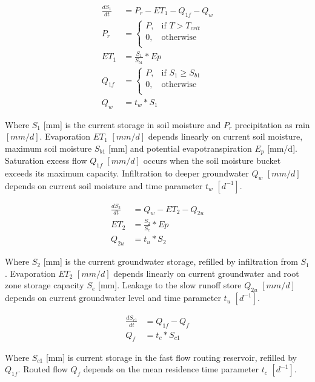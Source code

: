 {\begin{align}
	\frac{dS_1}{dt} &= P_r-ET_1-Q_{1f}-Q_w \\
	P_r &= \begin{cases}
		P, &\text{if } T > T_{crit} \\
		0, & \text{otherwise} \\
	\end{cases} \\
	ET_1 &= \frac{S_1}{S_{b1}}*Ep\\
	Q_{1f} &= \begin{cases}
		P, &\text{if } S_1 \geq S_{b1} \\
		0, & \text{otherwise} \\
	\end{cases} \\
	Q_w &= t_w*S_1
\end{align}

} %

Where $S_1$ [mm] is the current storage in soil moisture and $P_r$ precipitation as rain $[mm/d]$. Evaporation $ET_1$ $[mm/d]$ depends linearly on current soil moisture, maximum soil moisture $S_{b1}$ [mm] and potential evapotranspiration $E_p$ [mm/d]. Saturation excess flow $Q_{1f}$  $[mm/d]$ occurs when the soil moisture bucket exceeds its maximum capacity. Infiltration to deeper groundwater $Q_w$  $[mm/d]$ depends on current soil moisture and time parameter $t_w$  $[d^{-1}]$.

\begin{align}
	\frac{dS_2}{dt} &= Q_w-ET_2-Q_{2u}\\
	ET_2 &= \frac{S_2}{S_{e}}*Ep\\
	Q_{2u} &= t_u*S_2
\end{align}

Where $S_2$ [mm] is the current groundwater storage, refilled by infiltration from $S_1$. Evaporation $ET_2$ $[mm/d]$ depends linearly on current groundwater and root zone storage capacity $S_e$ [mm]. Leakage to the slow runoff store $Q_{2u}$ $[mm/d]$ depends on current groundwater level and time parameter $t_u$ $[d^{-1}]$. 

\begin{align}
	\frac{dS_{c1}}{dt} &= Q_{1f}-Q_{f}\\
	Q_f &= t_c*S_{c1}
\end{align}

Where $S_{c1}$ [mm] is current storage in the fast flow routing reservoir, refilled by $Q_{1f}$. Routed flow $Q_f$ depends on the mean residence time parameter $t_c$ $[d^{-1}]$.

